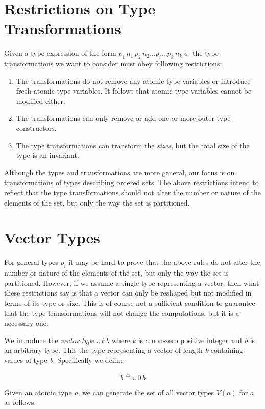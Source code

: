 \documentclass{article}
\begin{document}
\section{Restrictions on Type Transformations\label{Restrictions-on-Type}}

Given a type expression of the form $p_{1}\, n_{1}\, p_{2}\, n_{2}...p_{i}...p_{k}\, n_{k}\; a$,
the type transformations we want to consider must obey following restrictions:
\begin{enumerate}
\item The transformations do not remove any atomic type variables or introduce
fresh atomic type variables. It follows that atomic type variables
cannot be modified either. 
\item The transformations can only remove or add one or more outer type
constructors. 
\item The type transformations can transform the \emph{sizes}, but the total
size of the type is an invariant. 
\end{enumerate}
Although the types and transformations are more general, our focus
is on transformations of types describing ordered sets. The above
restrictions intend to reflect that the type transformations should
not alter the number or nature of the elements of the set, but only
the way the set is partitioned. 


\section{Vector Types}

For general types $p_{i}$ it may be hard to prove that the above
rules do not alter the number or nature of the elements of the set,
but only the way the set is partitioned. However, if we assume a single
type representing a vector, then what these restrictions say is that
a vector can only be reshaped but not modified in terms of its type
or size. This is of course not a sufficient condition to guarantee
that the type transformations will not change the computations, but
it is a necessary one.

We introduce the \emph{vector type} $\upsilon\, k\, b$ where \emph{k}
is a non-zero positive integer and \emph{b} is an arbitrary type.
This the type representing a vector of length \emph{k} containing
values of type \emph{b}. Specifically we define

\[
b\overset{{\scriptscriptstyle \triangle}}{=}\upsilon\,0\, b
\]


Given an atomic type \emph{a}, we can generate the set of all vector
types $V(a)$ for $a$ as follows:
\end{document}
